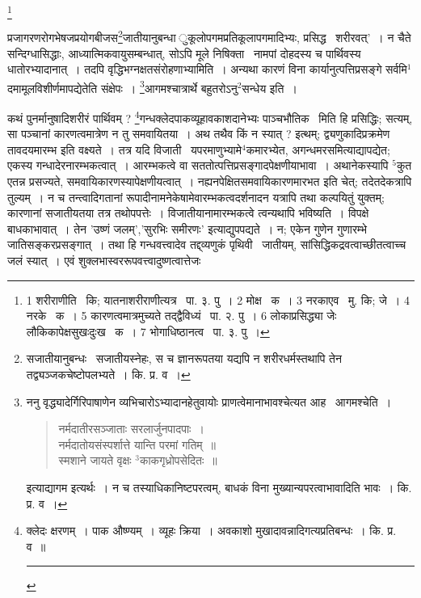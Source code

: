 \documentclass[11pt, openany]{book}
\newcommand\blfootnote[1]{%
 \begingroup
 \renewcommand\thefootnote{}\footnote{#1}%
 \addtocounter{footnote}{-1}%
 \endgroup
}
\begin{document}
\blfootnote{1 शरीराणीति  \textendash\ कि; यातनाशरीराणीत्यत्र  \textendash\ पा. ३. पु~। 2 मोक्ष  \textendash\ क~। 3 नरकाएव  \textendash\ मु. कि; जे~। 4 नरके  \textendash\ क~। 5 कारणत्वमात्रमुच्यते तद्द्वैविध्यं  \textendash\ पा. २. पु~। 6 लोकाप्रसिद्ध्या जेः लौकिकापेक्षसुखःदुःख  \textendash\ क~। 7 भोगाधिष्ठानत्व  \textendash\ पा. ३. पु~।}

\newpage
\begin{sloppypar}
\noindent
प्रजागरणरोगभेषजप्रयोगबीजस\renewcommand{\thefootnote}{१}\footnote{सजातीयानुबन्धः \textendash\ सजातीयस्नेहः, स च ज्ञानरूपतया यद्यपि न शरीरधर्मस्तथापि तेन तद्व्यञ्जकचेष्टोपलभ्यते~। कि. प्र. व~।}जातीयानुबन्धा ुकूलोपगमप्रतिकूलापगमादिभ्यः, प्रसिद्ध \textendash\ शरीरवत्'~। न चैते सन्दिग्धासिद्धाः, आध्यात्मिकवायुसम्बन्धात्, सोऽपि मूले निषिक्ता \textendash\ नामपां दोहदस्य च पार्थिवस्य धातोरभ्यादानात्~। तदपि वृद्धिभग्नक्षतसंरोहणाभ्यामिति~। अन्यथा कारणं विना कार्यानुत्पत्तिप्रसङ्गे सर्वमि$^1$दमामूलविशीर्णमापद्येतेति संक्षेपः~। \renewcommand{\thefootnote}{२}\footnote{ननु वृद्ध्यादेर्गिरिपाषाणेन व्यभिचारोऽभ्यादानहेतुवायोः प्राणत्वेमानाभावश्चेत्यत आह \textendash\ आगमश्चेति~।
\begin{quote}
{\qt नर्मदातीरसञ्जाताः सरलार्जुनपादपाः~।\\
नर्मदातोयसंस्पर्शात्ते यान्ति परमां गतिम्~॥\\
स्मशाने जायते वृक्षः ${}^3$काकगृध्रोपसेदितः~॥}
\end{quote}
इत्याद्यागम इत्यर्थः~। न च तस्याधिकानिष्टपरत्वम्, बाधकं विना मुख्यान्यपरत्वाभावादिति भावः~। कि. प्र. व~।}आगमश्चात्रार्थे बहुतरोऽनु$^2$सन्धेय इति~।
\end{sloppypar}

कथं पुनर्मानुषादिशरीरं पार्थिवम् ? \renewcommand{\thefootnote}{३}\footnote{क्लेदः क्षरणम्~। पाक औष्ण्यम्~। व्यूहः क्रिया~। अवकाशो मुखादावन्नादिगत्यप्रतिबन्धः~। कि. प्र. व~॥\\ \rule{0.4\linewidth}{0.5pt}}गन्धक्लेदपाकव्यूहावकाशदानेभ्यः पाञ्चभौतिक \textendash\ मिति हि प्रसिद्धिः; सत्यम्, सा पञ्चानां कारणत्वमात्रेण न तु समवायितया~। अथ तथैव किं न स्यात् ? इत्थम्; द्व्यणुकादिप्रक्रमेण तावदयमारम्भ इति वक्ष्यते~। तत्र यदि विजाती \textendash\ यपरमाणुभ्यामे$^4$कमारभ्येत, अगन्धमरसमित्याद्यापद्येत; एकस्य गन्धादेरनारम्भकत्वात्~। आरम्भकत्वे वा सततोत्पत्तिप्रसङ्गादपेक्षणीयाभावा~। अथानेकस्यापि ${}^5$कुत एतन्न प्रसज्यते, समवायिकारणस्यापेक्षणीयत्वात्~। नह्यनपेक्षितसमवायिकारणमारभत इति चेत्; तदेतदेकत्रापि तुल्यम्~। न च तन्त्वादिगतानां रूपादीनामनेकेषामेवारम्भकत्वदर्शनादन यत्रापि तथा कल्पयितुं युक्तम्; कारणानां सजातीयतया तत्र तथोपपत्तेः~। विजातीयानामारम्भकत्वे त्वन्यथापि भविष्यति~। विपक्षे बाधकाभावात्~। तेन 'उष्णं जलम्','सुरभिः समीरणः' इत्याद्युपपद्यते~। न; एकेन गुणेन गुणारम्भे जातिसङ्करप्रसङ्गात्~। तथा हि गन्धवत्त्वादेव तद्द्व्यणुकं पृथिवी \textendash\ जातीयम्, सांसिद्धिकद्रवत्वाच्छीतत्वाच्च जलं स्यात्~। एवं शुक्लभास्वररूपवत्त्वादुष्णत्वात्तेजः
\end{document}

